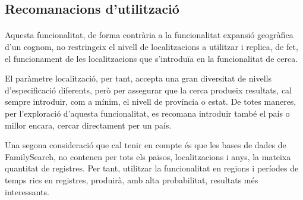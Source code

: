 \subsection{Recomanacions d'utilització}

    \paragraph{}
    Aquesta funcionalitat, de forma contrària a la funcionalitat expansió geogràfica d'un cognom, no restringeix el nivell de localitzacions a utilitzar i replica, de fet, el funcionament de les localitzacions que s'introduïa en la funcionalitat de cerca.

    El paràmetre localització, per tant, accepta una gran diversitat de nivells d'especi\-fi\-ca\-ció diferents, però per assegurar que la cerca produeix resultats, cal sempre introduir, com a mínim, el nivell de província o estat. De totes maneres, per l'exploració d'aquesta funcionalitat, es recomana introduir també el país o millor encara, cercar directament per un país.

    Una segona consideració que cal tenir en compte és que les bases de dades de Family\-Search, no contenen per tots els països, localitzacions i anys, la mateixa quantitat de registres. Per tant, utilitzar la funcionalitat en regions i períodes de temps rics en registres, produirà, amb alta probabilitat, resultats més interessants.
